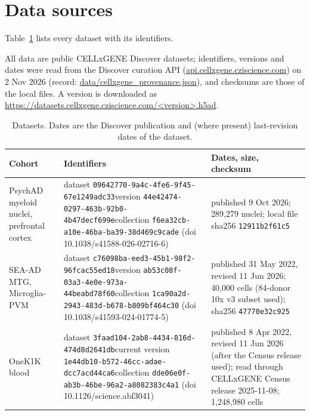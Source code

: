 



\section{Data sources}\label{app:data}
Table~\ref{tab:data} lists every dataset with its identifiers.

All data are public CELLxGENE Discover datasets; identifiers, versions and dates were read from the Discover curation API (\url{api.cellxgene.cziscience.com}) on 2 Nov 2026 (record: \url{data/cellxgene_provenance.json}), and checksums are those of the local files. A version is downloaded as \url{https://datasets.cellxgene.cziscience.com/<version>.h5ad}.
\begin{table}[!ht]\centering\scriptsize\setlength{\tabcolsep}{3pt}
\caption{Datasets. Dates are the Discover publication and (where present) last-revision dates of the dataset.}\label{tab:data}
\begin{tabular}{@{}p{1.15in}p{2.55in}p{2.55in}@{}}\toprule
Cohort & Identifiers & Dates, size, checksum\\\midrule
PsychAD myeloid nuclei, prefrontal cortex \citep{Lee2026} & dataset \nolinkurl{09642770-9a4c-4fe6-9f45-67e1249adc33}\newline version \nolinkurl{44e42474-0297-463b-92b0-4b47decf699e}\newline collection \nolinkurl{f6ea32cb-a10e-46ba-ba39-38d469c9cade} (doi 10.1038/s41588-026-02716-6) & published 9 Oct 2026; 289{,}279 nuclei; local file sha256 \texttt{12911b2f61c5}\\[3pt]
SEA-AD MTG, Microglia-PVM \citep{Gabitto2024SEAAD} & dataset \nolinkurl{c76098ba-eed3-45b1-98f2-96fcac55ed18}\newline version \nolinkurl{ab53c08f-03a3-4e0e-973a-44beabd78f60}\newline collection \nolinkurl{1ca90a2d-2943-483d-b678-b809bf464c30} (doi 10.1038/s41593-024-01774-5) & published 31 May 2022, revised 11 Jun 2026; 40{,}000 cells (84-donor 10x v3 subset used); sha256 \texttt{47770e32c925}\\[3pt]
OneK1K blood \citep{Yazar2022} & dataset \nolinkurl{3faad104-2ab8-4434-816d-474d8d2641db}\newline current version \nolinkurl{1e44db10-b572-46cc-adae-dcc7acd44ca6}\newline collection \nolinkurl{dde06e0f-ab3b-46be-96a2-a8082383c4a1} (doi 10.1126/science.abf3041) & published 8 Apr 2022, revised 11 Jun 2026 (after the Census release used); read through CELLxGENE Census release 2025-11-08; 1{,}248{,}980 cells\\[3pt]

\end{tabular}
\end{table}
